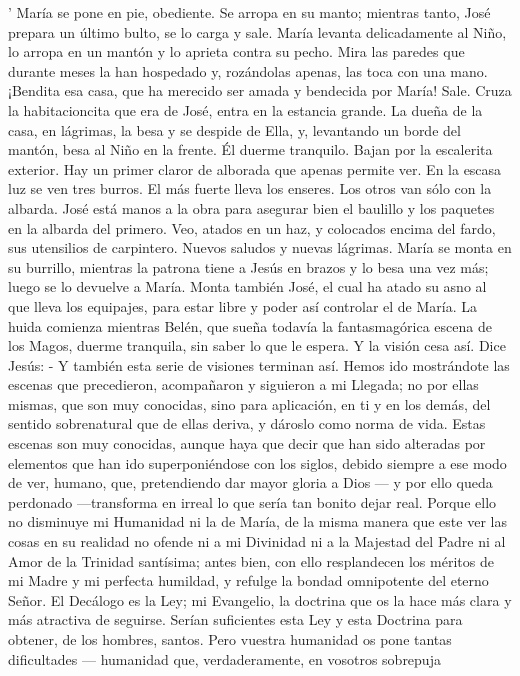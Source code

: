 \documentclass[12pt]{book} %
\begin{document}
' 
María se pone en pie, obediente. Se arropa en su manto; mientras tanto, José prepara un último bulto, se lo carga y 
sale. 
María levanta delicadamente al Niño, lo arropa en un mantón y lo aprieta contra su pecho. Mira las paredes que 
durante meses la han hospedado y, rozándolas apenas, las toca con una mano. ¡Bendita esa casa, que ha merecido ser amada y bendecida por María! 
Sale. Cruza la habitacioncita que era de José, entra en la estancia grande. La dueña de la casa, en lágrimas, la besa y se 
despide de Ella, y, levantando un borde del mantón, besa al Niño en la frente. Él duerme tranquilo. Bajan por la escalerita exterior. 
Hay un primer claror de alborada que apenas permite ver. En la escasa luz se ven tres burros. El más fuerte lleva los 
enseres. Los otros van sólo con la albarda. José está manos a la obra para asegurar bien el baulillo y los paquetes en la albarda del primero. Veo, atados en un haz, y colocados encima del fardo, sus utensilios de carpintero. 
Nuevos saludos y nuevas lágrimas. María se monta en su burrillo, mientras la patrona tiene a Jesús en brazos y lo besa 
una vez más; luego se lo devuelve a María. Monta también José, el cual ha atado su asno al que lleva los equipajes, para estar libre y poder así controlar el de María. 
La huida comienza mientras Belén, que sueña todavía la fantasmagórica escena de los Magos, duerme tranquila, sin 
saber lo que le espera. 
Y la visión cesa así. 
Dice Jesús: 
- Y también esta serie de visiones terminan así. Hemos ido mostrándote las escenas que precedieron, acompañaron y 
siguieron a mi Llegada; no por ellas mismas, que son muy conocidas, sino para aplicación, en ti y en los demás, del sentido sobrenatural que de ellas deriva, y dároslo como norma de vida. Estas escenas son muy conocidas, aunque haya que decir que han sido alteradas por elementos que han ido superponiéndose con los siglos, debido siempre a ese modo de ver, humano, que, pretendiendo dar mayor gloria a Dios — y por ello queda perdonado —transforma en irreal lo que sería tan bonito dejar real. Porque ello no disminuye mi Humanidad ni la de María, de la misma manera que este ver las cosas en su realidad no ofende ni a mi Divinidad ni a la Majestad del Padre ni al Amor de la Trinidad santísima; antes bien, con ello resplandecen los méritos de mi Madre y mi perfecta humildad, y refulge la bondad omnipotente del eterno Señor. 
El Decálogo es la Ley; mi Evangelio, la doctrina que os la hace más clara y más atractiva de seguirse. Serían suficientes 
esta Ley y esta Doctrina para obtener, de los hombres, santos. 
Pero vuestra humanidad os pone tantas dificultades — humanidad que, verdaderamente, en vosotros sobrepuja 
\end{document}

